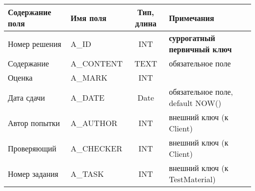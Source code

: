 \documentclass[a4paper,14pt]{article}
\begin{document}
\begin{table}[H]
	\begin{flushleft} 
	\end{flushleft}
	\begin{adjustbox}{width=\linewidth}
		\begin{tabular}{|l|l|c|l|}
			\hline
			Содержание поля & Имя поля   & Тип, длина & Примечания                          \\ \hline
			Номер решения   & A\_ID      &    INT    & \textbf{суррогатный первичный ключ} \\ \hline
			Содержание      & A\_CONTENT &    TEXT    & обязательное поле                   \\ \hline
			Оценка          & A\_MARK    &    INT    &                                     \\ \hline
			Дата сдачи      & A\_DATE    &    Date    & обязательное поле, default NOW()    \\ \hline
			Автор попытки   & A\_AUTHOR  &    INT    & внешний ключ (к Client)               \\ \hline
			Проверяющий     & A\_CHECKER &    INT    & внешний ключ (к Client)               \\ \hline
			Номер задания   & A\_TASK    &    INT    & внешний ключ (к TestMaterial)       \\ \hline
		\end{tabular}
	\end{adjustbox}
\end{table}

\end{document}
